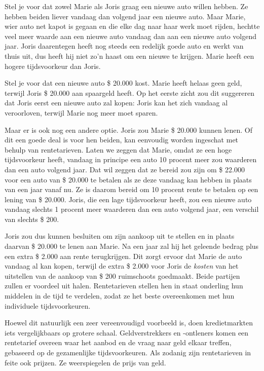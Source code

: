 \documentclass[
  a5paper,
  smalldemyvopaper,11pt,twoside,onecolumn,openright,extrafontsizes,
hidelinks]{memoir}
\begin{document}
Stel je voor dat zowel Marie als Joris graag een nieuwe auto willen
hebben. Ze hebben beiden liever vandaag dan volgend jaar een nieuwe
auto. Maar Marie, wier auto net kapot is gegaan en die elke dag naar
haar werk moet rijden, hechtte veel meer waarde aan een nieuwe auto
vandaag dan aan een nieuwe auto volgend jaar. Joris daarentegen heeft
nog steeds een redelijk goede auto en werkt van thuis uit, dus heeft hij
niet zo'n haast om een nieuwe te krijgen. Marie heeft een hogere
tijdsvoorkeur dan Joris.

Stel je voor dat een nieuwe auto \$ 20.000 kost. Marie heeft helaas geen
geld, terwijl Joris \$ 20.000 aan spaargeld heeft. Op het eerste zicht
zou dit suggereren dat Joris eerst een nieuwe auto zal kopen: Joris kan
het zich vandaag al veroorloven, terwijl Marie nog meer moet sparen.

Maar er is ook nog een andere optie. Joris zou Marie \$ 20.000 kunnen
lenen. Of dit een goede deal is voor hen beiden, kan eenvoudig worden
ingeschat met behulp van rentetarieven. Laten we zeggen dat Marie, omdat
ze een hoge tijdsvoorkeur heeft, vandaag in principe een auto 10 procent
meer zou waarderen dan een auto volgend jaar. Dat wil zeggen dat ze
bereid zou zijn om \$ 22.000 voor een auto van \$ 20.000 te betalen als
ze deze vandaag kan hebben in plaats van een jaar vanaf nu. Ze is daarom
bereid om 10 procent rente te betalen op een lening van \$ 20.000.
Joris, die een lage tijdsvoorkeur heeft, zou een nieuwe auto vandaag
slechts 1 procent meer waarderen dan een auto volgend jaar, een verschil
van slechts \$ 200.

Joris zou dus kunnen besluiten om zijn aankoop uit te stellen en in
plaats daarvan \$ 20.000 te lenen aan Marie. Na een jaar zal hij het
geleende bedrag plus een extra \$ 2.000 aan rente terugkrijgen. Dit
zorgt ervoor dat Marie de auto vandaag al kan kopen, terwijl de extra \$
2.000 voor Joris de \emph{kosten} van het uitstellen van de aankoop van
\$ 200 ruimschoots goedmaakt. Beide partijen zullen er voordeel uit
halen. Rentetarieven stellen hen in staat onderling hun middelen in de
tijd te verdelen, zodat ze het beste overeenkomen met hun individuele
tijdsvoorkeuren.

Hoewel dit natuurlijk een zeer vereenvoudigd voorbeeld is, doen
kredietmarkten iets vergelijkbaars op grotere schaal. Geldverstrekkers
en -ontleners komen een rentetarief overeen waar het aanbod en de vraag
naar geld elkaar treffen, gebaseerd op de gezamenlijke tijdsvoorkeuren.
Als zodanig zijn rentetarieven in feite ook prijzen. Ze weerspiegelen de
prijs van geld.
\end{document}
